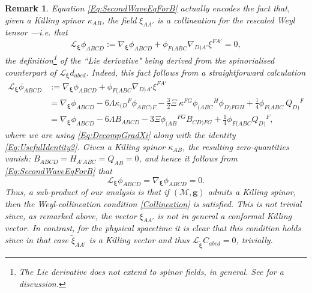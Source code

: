 \documentclass[10pt,a4paper]{article}
\theoremstyle{plain}
\newtheorem{remark}{Remark}
\def\bmg{{\bm g}}
\begin{document}
\begin{remark}
  \emph{ Equation \eqref{Eq:SecondWaveEqForB} actually encodes the
  fact that, \emph{given a Killing spinor} $\kappa_{AB}$, the field
  $\xi_{AA'}$ is a collineation for the rescaled Weyl tensor
  ---i.e. that
\[  \mathcal{L}_{\bm\xi}\phi_{ABCD} := \nabla_{\bm\xi}\phi_{ABCD} + \phi_{F(ABC}\nabla_{D)A'}\xi^{FA'}=0,\] 
the definition\footnote{The Lie derivative does not extend to spinor
fields, in general. See \cite{PenRin86} for a discussion.} of the
``Lie derivative" being derived from the spinorialised counterpart of
$\mathcal{L}_{\bm\xi}d_{abcd}$. Indeed, this fact follows from a
straightforward calculation
\begin{align*}
    \mathcal{L}_{\bm\xi}\phi_{ABCD}&:= \nabla_{\bm\xi}\phi_{ABCD}
    + \phi_{F(ABC}\nabla_{D)A'}\xi^{FA'} \\ &=
    \nabla_{\bm\xi}\phi_{ABCD}-6\Lambda \kappa_{(D}{}^{F} \phi_{ABC)F}
    - \tfrac{3}{2} \Xi \ \kappa^{FG} \phi_{(ABC}{}^{H} \phi_{D)FGH} +
    \tfrac{1}{4} \phi_{F(ABC} \ Q_{D)}{}^{F}\\ &=
    \nabla_{\bm\xi}\phi_{ABCD}-6\Lambda B_{ABCD} - 3\Xi
    \phi_{(AB}{}^{FG}B_{CD)FG} + \tfrac{1}{4}\phi_{F(ABC}Q_{D)}{}^F,
\end{align*}
where we are using \eqref{Eq:DecompGradXi} along with the identity
\eqref{Eq:UsefulIdentity2}. Given a Killing spinor $\kappa_{AB}$, the
resulting zero-quantities vanish: $B_{ABCD}=H_{A'ABC}=Q_{AB}=0$, and
hence it follows from \eqref{Eq:SecondWaveEqForB} that
\begin{equation}\mathcal{L}_{\bm\xi}\phi_{ABCD} = \nabla_{\bm\xi}\phi_{ABCD} =0. \label{Collineation}
\end{equation}
Thus, a sub-product of our analysis is that if $(\mathcal{M},\bmg)$
admits a Killing spinor, then the Weyl-collineation condition
\eqref{Collineation} is satisfied.  This is not trivial since, as remarked above, the
vector $\xi_{AA'}$ is not in general a
conformal Killing vector. In contrast,
for the physical spacetime it is clear that this condition holds 
since in that case $\tilde{\xi}_{AA'}$ is a Killing vector and thus
$\mathcal{L}_{\bm{\tilde{\xi}}}C_{abcd}=0$, trivially.
}
\end{remark}
\end{document}

